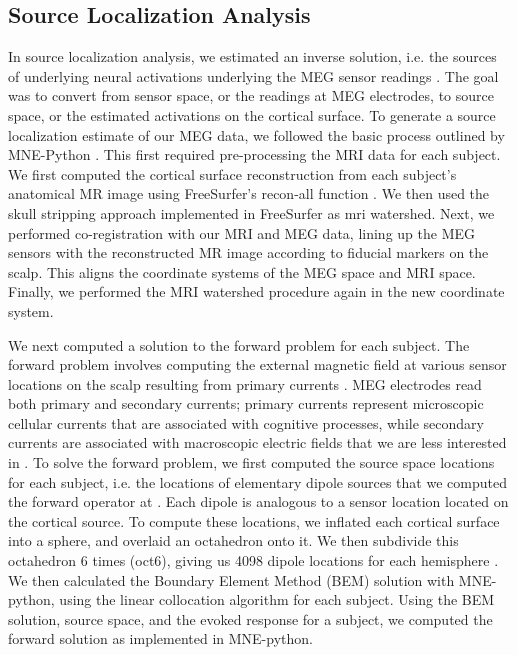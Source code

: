 \documentclass[../main.tex]{subfiles}
\begin{document}
\subsection{Source Localization Analysis}
In source localization analysis, we estimated an inverse solution, i.e. the sources of underlying neural activations underlying the MEG sensor readings \citep{mne}. The goal was to convert from sensor space, or the readings at MEG electrodes, to source space, or the estimated activations on the cortical surface. To generate a source localization estimate of our MEG data, we followed the basic process outlined by MNE-Python \citep{mne}. This first required pre-processing the MRI data for each subject. We first computed the cortical surface reconstruction from each subject's anatomical MR image using FreeSurfer's recon-all function \citep{DALE1999179}. We then used the skull stripping approach \citep{segonne_2004} implemented in FreeSurfer as mri watershed. Next, we performed co-registration with our MRI and MEG data, lining up the MEG sensors with the reconstructed MR image according to fiducial markers on the scalp. This aligns the coordinate systems of the MEG space and MRI space. Finally, we performed the MRI watershed procedure again in the new coordinate system.

We next computed a solution to the forward problem for each subject. The forward problem involves computing the external magnetic field at various sensor locations on the scalp resulting from primary currents \citep{mosher99}. MEG electrodes read both primary and secondary currents; primary currents represent microscopic cellular currents that are associated with cognitive processes, while secondary currents are associated with macroscopic electric fields that we are less interested in \citep{mosher99}. To solve the forward problem, we first computed the source space locations for each subject, i.e. the locations of elementary dipole sources that we computed the forward operator at \citep{mne}. Each dipole is analogous to a sensor location located on the cortical source. To compute these locations, we inflated each cortical surface into a sphere, and overlaid an octahedron onto it. We then subdivide this octahedron 6 times (oct6), giving us 4098 dipole locations for each hemisphere \citep{mne}. We then calculated the Boundary Element Method (BEM) solution with MNE-python, using the linear collocation algorithm \citep{mosher99, hamalainen89} for each subject. Using the BEM solution, source space, and the evoked response for a subject, we computed the forward solution as implemented in MNE-python.
\end{document}
